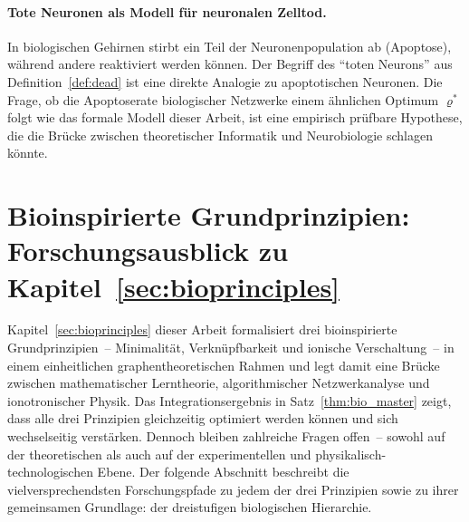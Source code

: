 \documentclass[12pt, a4paper, openany]{report}
\begin{document}
\paragraph{Tote Neuronen als Modell für neuronalen Zelltod.}
In biologischen Gehirnen stirbt ein Teil der Neuronenpopulation ab
(Apoptose), während andere reaktiviert werden können.  Der Begriff des
``toten Neurons'' aus Definition~\ref{def:dead} ist eine direkte Analogie
zu apoptotischen Neuronen.  Die Frage, ob die Apoptoserate biologischer
Netzwerke einem ähnlichen Optimum $\varrho^*$ folgt wie das formale Modell
dieser Arbeit, ist eine empirisch prüfbare Hypothese, die die Brücke
zwischen theoretischer Informatik und Neurobiologie schlagen könnte.

\section{Bioinspirierte Grundprinzipien: Forschungsausblick zu
  Kapitel~\ref{sec:bioprinciples}}
\label{sec:outlook_bioprinciples}

Kapitel~\ref{sec:bioprinciples} dieser Arbeit formalisiert drei
bioinspirierte Grundprinzipien~-- Minimalität, Verknüpfbarkeit und ionische
Verschaltung~-- in einem einheitlichen graphentheoretischen Rahmen und legt
damit eine Brücke zwischen mathematischer Lerntheorie, algorithmischer
Netzwerkanalyse und ionotronischer Physik.  Das Integrationsergebnis in
Satz~\ref{thm:bio_master} zeigt, dass alle drei Prinzipien gleichzeitig
optimiert werden können und sich wechselseitig verstärken.  Dennoch bleiben
zahlreiche Fragen offen~-- sowohl auf der theoretischen als auch auf der
experimentellen und physikalisch-technologischen Ebene.  Der folgende
Abschnitt beschreibt die vielversprechendsten Forschungspfade zu jedem der
drei Prinzipien sowie zu ihrer gemeinsamen Grundlage: der drei\-stu\-fi\-gen
biologischen Hierarchie.
\end{document}
